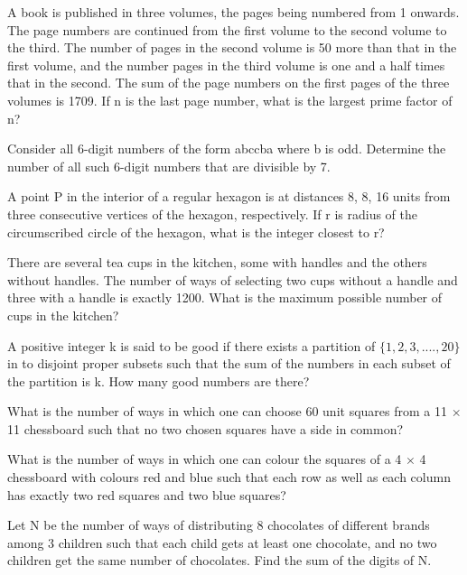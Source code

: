 \item A book is published in three volumes, the pages being numbered from 1 onwards. The page numbers are continued from the first volume to the second volume to the third. The number of pages in the second volume is 50 more than that in the first volume, and the number pages in the third volume is one and a half times that in the second. The sum of the page numbers on the first pages of the three volumes is 1709. If n is the last page number, what is the largest prime factor of n?

\item Consider all 6-digit numbers of the form abccba where b is odd. Determine the number of all such 6-digit numbers that are divisible by 7.

\item A point P in the interior of a regular hexagon is at distances 8, 8, 16 units from three consecutive vertices of the hexagon, respectively. If r is radius of the circumscribed circle of the hexagon, what is the integer closest to r?

\item There are several tea cups in the kitchen, some with handles and the others without handles. The number of ways of selecting two cups without a handle and three with a handle is exactly 1200. What is the maximum possible number of cups in the kitchen?

\item A positive integer k is said to be good if there exists a partition of $\{1, 2, 3,...., 20\}$ in to disjoint proper subsets such that the sum of the numbers in each subset of the partition is k.
How many good numbers are there?

\item What is the number of ways in which one can choose 60 unit squares from a 11 $\times$ 11 chessboard such that no two chosen squares have a side in common?

\item What is the number of ways in which one can colour the squares of a 4 $\times$ 4 chessboard with colours red and blue such that each row as well as each column has exactly two red squares and two blue squares?

\item Let N be the number of ways of distributing 8 chocolates of different brands among 3 children such that each child gets at least one chocolate, and no two children get the same number of chocolates. Find the sum of the digits of N.

